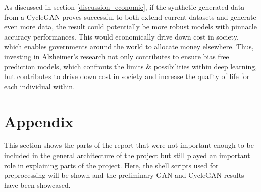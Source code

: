 \documentclass[11pt, fleqn, titlepage]{article}
\newcommand{\1}[1]{\mathds{1}\left[#1\right]}
\begin{document}
As discussed in section \ref{discussion_economic}, if the synthetic generated data from a CycleGAN proves successful to both extend current datasets and generate even more data, the result could potentially be more robust models with pinnacle accuracy performances. This would economically drive down cost in society, which enables governments around the world to allocate money elsewhere. Thus, investing in Alzheimer's research not only contributes to ensure bias free prediction models, which confronts the limits \& possibilities within deep learning, but contributes to drive down cost in society and increase the quality of life for each individual within.

\newpage
\section{Appendix}\label{appendix}
This section shows the parts of the report that were not important enough to be included in the general architecture of the project but still played an important role in explaining parts of the project. Here, the shell scripts used for preprocessing will be shown and the preliminary GAN and CycleGAN results have been showcased.
\end{document}
